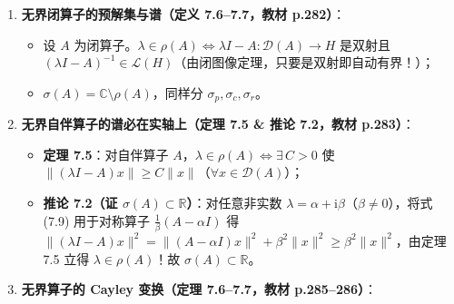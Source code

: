 \documentclass[11pt,a4paper]{article}
\providecommand{\tightlist}{\setlength{\itemsep}{2pt}\setlength{\parskip}{0pt}}
\begin{document}
\begin{enumerate}
\def\labelenumi{\arabic{enumi}.}
\tightlist
\item
  \textbf{无界闭算子的预解集与谱（定义 7.6--7.7，教材 p.282）}：

  \begin{itemize}
  \tightlist
  \item
    设 \(A\) 为闭算子。\(\lambda \in \rho(A) \iff \lambda I - A: \mathcal{D}(A) \to H\) 是双射且 \((\lambda I - A)^{-1} \in \mathcal{L}(H)\)（由闭图像定理，只要是双射即自动有界！）；
  \item
    \(\sigma(A) = \mathbb{C} \setminus \rho(A)\)，同样分 \(\sigma_p, \sigma_c, \sigma_r\)。
  \end{itemize}
\item
  \textbf{无界自伴算子的谱必在实轴上（定理 7.5 \& 推论 7.2，教材 p.283）}：

  \begin{itemize}
  \tightlist
  \item
    \textbf{定理 7.5}：对自伴算子 \(A\)，\(\lambda \in \rho(A) \iff \exists\, C > 0\) 使 \(\lVert(\lambda I - A)x\rVert \ge C\lVert x\rVert\)（\(\forall x \in \mathcal{D}(A)\)）；
  \item
    \textbf{推论 7.2（证 \(\sigma(A) \subset \mathbb{R}\)）}：对任意非实数 \(\lambda = \alpha + \mathrm{i}\beta\)（\(\beta \neq 0\)），将式 (7.9) 用于对称算子 \(\frac{1}{\beta}(A - \alpha I)\) 得 \(\lVert(\lambda I - A)x\rVert^2 = \lVert(A-\alpha I)x\rVert^2 + \beta^2\lVert x\rVert^2 \ge \beta^2\lVert x\rVert^2\)，由定理 7.5 立得 \(\lambda \in \rho(A)\)！故 \(\sigma(A) \subset \mathbb{R}\)。
  \end{itemize}
\item
  \textbf{无界算子的 Cayley 变换（定理 7.6--7.7，教材 p.285--286）}：


\end{enumerate}
\end{document}

